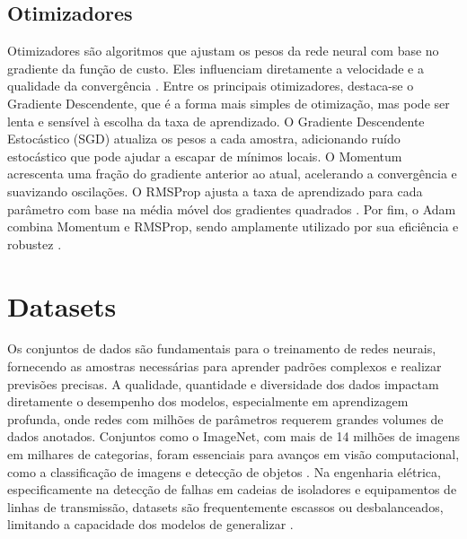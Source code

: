 \subsection{Otimizadores}

Otimizadores são algoritmos que ajustam os pesos da rede neural com base no gradiente da função de custo. Eles influenciam diretamente a velocidade e a qualidade da convergência \cite{ruder2016overview}. Entre os principais otimizadores, destaca-se o Gradiente Descendente, que é a forma mais simples de otimização, mas pode ser lenta e sensível à escolha da taxa de aprendizado. O Gradiente Descendente Estocástico (SGD) atualiza os pesos a cada amostra, adicionando ruído estocástico que pode ajudar a escapar de mínimos locais. O Momentum acrescenta uma fração do gradiente anterior ao atual, acelerando a convergência e suavizando oscilações. O RMSProp ajusta a taxa de aprendizado para cada parâmetro com base na média móvel dos gradientes quadrados \cite{tieleman2012lecture}. Por fim, o Adam combina Momentum e RMSProp, sendo amplamente utilizado por sua eficiência e robustez \cite{kingma2014adam}.

\section{Datasets}

Os conjuntos de dados são fundamentais para o treinamento de redes neurais, fornecendo as amostras necessárias para aprender padrões complexos e realizar previsões precisas. A qualidade, quantidade e diversidade dos dados impactam diretamente o desempenho dos modelos, especialmente em aprendizagem profunda, onde redes com milhões de parâmetros requerem grandes volumes de dados anotados. Conjuntos como o ImageNet, com mais de 14 milhões de imagens em milhares de categorias, foram essenciais para avanços em visão computacional, como a classificação de imagens e detecção de objetos \cite{deng2009imagenet}. Na engenharia elétrica, especificamente na detecção de falhas em cadeias de isoladores e equipamentos de linhas de transmissão, datasets são frequentemente escassos ou desbalanceados, limitando a capacidade dos modelos de generalizar \cite{shorten2019survey}.

